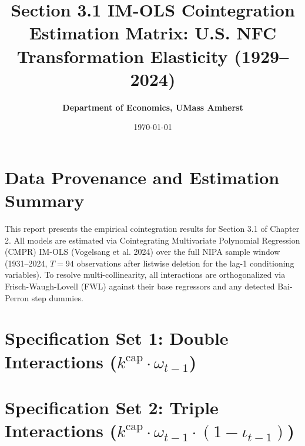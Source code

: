 \documentclass[11pt,a4paper]{article}
\title{\textbf{Section 3.1 IM-OLS Cointegration Estimation Matrix: U.S. NFC Transformation Elasticity (1929--2024)}}
\author{\textbf{Department of Economics, UMass Amherst}}
\date{\today}
\begin{document}
\maketitle

\section*{Data Provenance and Estimation Summary}
This report presents the empirical cointegration results for Section 3.1 of Chapter 2. All models are estimated via Cointegrating Multivariate Polynomial Regression (CMPR) IM-OLS (Vogelsang et al. 2024) over the full NIPA sample window (1931--2024, $T=94$ observations after listwise deletion for the lag-1 conditioning variables). To resolve multi-collinearity, all interactions are orthogonalized via Frisch-Waugh-Lovell (FWL) against their base regressors and any detected Bai-Perron step dummies.

\FloatBarrier
\section{Specification Set 1: Double Interactions ($k^{\text{cap}} \cdot \omega_{t-1}$)}
\FloatBarrier


\FloatBarrier
\section{Specification Set 2: Triple Interactions ($k^{\text{cap}} \cdot \omega_{t-1} \cdot (1-\iota_{t-1})$)}
\FloatBarrier

\end{document}
